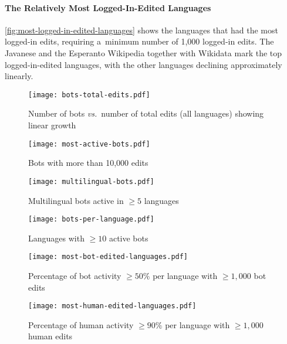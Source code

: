 \documentclass{sig-alternate}
\begin{document}
\paragraph{The Relatively Most Logged-In-Edited Languages}

\autoref{fig:most-logged-in-edited-languages} shows
the languages that had the most logged-in edits,
requiring a~minimum number of 1,000 logged-in edits.
The Javanese and the Esperanto Wikipedia together with Wikidata
mark the top logged-in-edited languages,
with the other languages declining approximately linearly.

\begin{figure}[p]
  \center
  \texttt{[image: bots-total-edits.pdf]}
  \caption{Number of bots \emph{vs.}\ number of total edits
    (all languages) showing linear growth}
  \label{fig:bots-total-edits}
\end{figure}

\begin{figure}[p]
  \center
  \texttt{[image: most-active-bots.pdf]}
  \caption{Bots with more than 10,000 edits}
  \label{fig:most-active-bots}
\end{figure}

\begin{figure}[p]
  \center
  \texttt{[image: multilingual-bots.pdf]}
  \caption{Multilingual bots active in $\geq5$ languages}
  \label{fig:multilingual-bots}
\end{figure}

\begin{figure}[p]
  \center
  \texttt{[image: bots-per-language.pdf]}
  \caption{Languages with $\geq10$ active bots}
  \label{fig:bots-per-language}
\end{figure}

\begin{figure}[p]
  \center
  \texttt{[image: most-bot-edited-languages.pdf]}
  \caption{Percentage of bot activity $\geq50\%$ per language with $\geq1,000$ bot edits}
  \label{fig:most-bot-edited-languages}
\end{figure}

\begin{figure}[p]
  \center
  \texttt{[image: most-human-edited-languages.pdf]}
  \caption{Percentage of human activity $\geq90\%$ per language with $\geq1,000$ human edits}
  \label{fig:most-human-edited-languages}
\end{figure}
\end{document}
